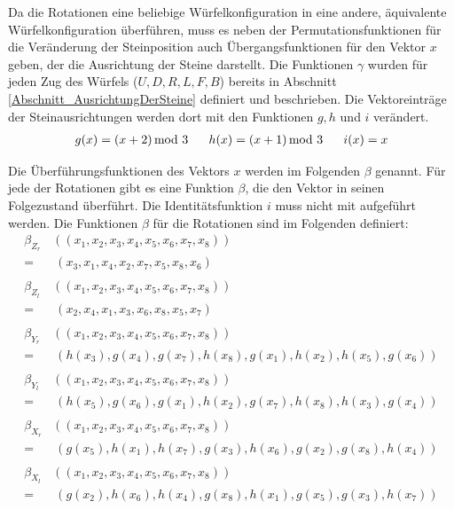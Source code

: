 \documentclass[12pt,a4paper, usenames, dvipsnames]{article}
\theoremstyle{mystyle}
\theoremstyle{definition}
\begin{document}
Da die Rotationen eine beliebige Würfelkonfiguration in eine andere, äquivalente Würfelkonfiguration überführen, muss es neben der Permutationsfunktionen für die Veränderung der Steinposition auch Übergangsfunktionen für den Vektor $x$ geben, der die Ausrichtung der Steine darstellt. Die Funktionen $\gamma$ wurden für jeden Zug des Würfels ($U, D, R, L, F, B$) bereits in Abschnitt \ref{Abschnitt_AusrichtungDerSteine} definiert und beschrieben. Die Vektoreinträge der Steinausrichtungen werden dort mit den Funktionen $g, h$ und $i$ verändert.
\begin{align*}
g(x)=(x + 2) \hspace*{-0.5em} \mod 3 \ \ \ \ \ h(x) = (x+1) \hspace*{-0.5em} \mod 3 \ \ \ \ \ i(x)=x
\end{align*}

Die Überführungsfunktionen des Vektors $x$ werden im Folgenden $\beta$ genannt. Für jede der Rotationen gibt es eine Funktion $\beta$, die den Vektor in seinen Folgezustand überführt. Die Identitätsfunktion $i$ muss nicht mit aufgeführt werden. Die Funktionen $\beta$ für die Rotationen sind im Folgenden definiert:
\begin{align*}
\beta_{Z_r}  & \left( (x_1, x_2, x_3, x_4, x_5,x_6,x_7,x_8) \right)  \\
=  & \ (x_3, x_1, x_4, x_2, x_7, x_5, x_8, x_6) \\
\\
\beta_{Z_l}  &   \left( (x_1, x_2, x_3, x_4, x_5,x_6,x_7,x_8) \right)  \\
=  &  \ (x_2, x_4, x_1, x_3, x_6, x_8, x_5, x_7) \\
\\
\beta_{Y_r}  &  \left( (x_1, x_2, x_3, x_4, x_5,x_6,x_7,x_8)  \right) \\
=  & \ (h(x_3), g(x_4), g(x_7), h(x_8), g(x_1), h(x_2), h(x_5), g(x_6)) \\
\\
\beta_{Y_l}  &   \left( (x_1, x_2, x_3, x_4, x_5,x_6,x_7,x_8) \right)  \\
=  & \ (h(x_5), g(x_6), g(x_1), h(x_2),g(x_7),h(x_8),h(x_3),g(x_4)) \\
\\
\beta_{X_r}  &  \left( (x_1, x_2, x_3, x_4, x_5,x_6,x_7,x_8)  \right) \\
=  & \ (g(x_5), h(x_1), h(x_7), g(x_3), h(x_6), g(x_2), g(x_8),h(x_4)) \\
\\
\beta_{X_l}  &  \left( (x_1, x_2, x_3, x_4, x_5,x_6,x_7,x_8) \right)  \\
=  & \ (g(x_2), h(x_6), h(x_4),g(x_8), h(x_1), g(x_5), g(x_3), h(x_7)) 
\end{align*}
\end{document}
